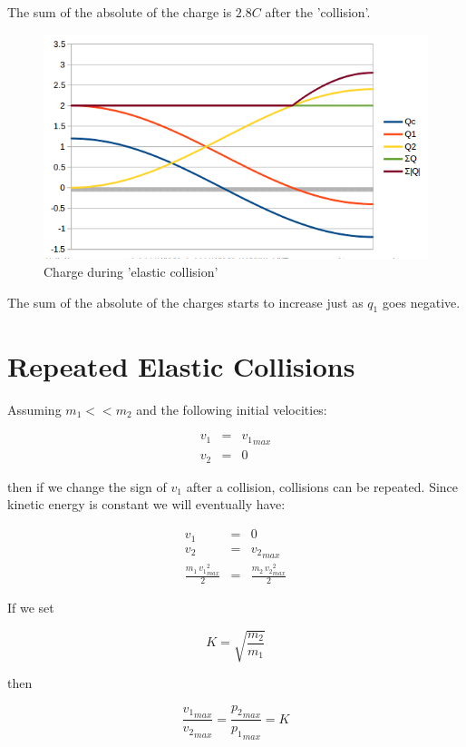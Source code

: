 The sum of the absolute of the charge is $2.8 C$ after the 'collision'.

\begin{figure}[ht] \centering
	\includegraphics[scale=.5]{cclg} \caption{Charge during 'elastic collision'}
\end{figure}

The sum of the absolute of the charges starts to increase just as $q_1$ goes negative.

\section{Repeated Elastic Collisions}

Assuming $m_1<<m_2$ and the following initial velocities:

\begin{eqnarray}
v_1 &=& {v_1}_{max} \\
v_2 &=& 0
\end{eqnarray}

then if we change the sign of $v_1$ after a collision, collisions can be repeated.
Since kinetic energy is constant we will eventually have:

\begin{eqnarray}
v_1 &=& 0 \\
v_2 &=& {v_2}_{max} \\
\frac{m_1 \, {v_1}_{max}^2}{2} &=& \frac{m_2 \, {v_2}_{max}^2}{2}
\end{eqnarray}

If we set

\begin{equation}
K = \sqrt{\frac{m_2}{m_1}}
\end{equation}

then

\begin{equation}
\frac{{v_1}_{max}}{{v_2}_{max}} = \frac{{p_2}_{max}}{{p_1}_{max}} = K
\end{equation}


